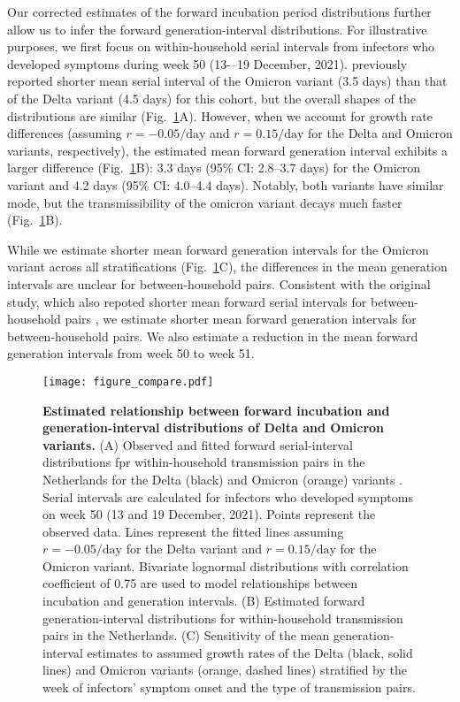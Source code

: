 \documentclass[12pt]{article}
\newcommand{\fref}[1]{Fig.~\ref{fig:#1}}
\begin{document}
Our corrected estimates of the forward incubation period distributions further allow us to infer the forward generation-interval distributions.
For illustrative purposes, we first focus on within-household serial intervals from infectors who developed symptoms during week 50 (13-–19 December, 2021).
\citep{backer2021omicron} previously reported shorter mean serial interval of the Omicron variant (3.5 days) than that of the Delta variant (4.5 days) for this cohort, but the overall shapes of the distributions are similar (\fref{serial}A).
However, when we account for growth rate differences (assuming $r=-0.05/\mathrm{day}$ and $r=0.15/\mathrm{day}$ for the Delta and Omicron variants, respectively), the estimated mean forward generation interval exhibits a larger difference (\fref{serial}B): 3.3 days (95\% CI: 2.8--3.7 days) for the Omicron variant and 4.2 days (95\% CI: 4.0--4.4 days).
Notably, both variants have similar mode, but the transmissibility of the omicron variant decays much faster (\fref{serial}B).

While we estimate shorter mean forward generation intervals for the Omicron variant across all stratifications (\fref{serial}C), the differences in the mean generation intervals are unclear for between-household pairs.
Consistent with the original study, which also repoted shorter mean forward serial intervals for between-household pairs \citep{backer2021omicron}, we estimate shorter mean forward generation intervals for between-household pairs.
We also estimate a reduction in the mean forward generation intervals from week 50 to week 51. 

\begin{figure}[!th]
\texttt{[image: figure\_compare.pdf]}
\caption{
\textbf{Estimated relationship between forward incubation and generation-interval distributions of Delta and Omicron variants.}
(A) Observed and fitted forward serial-interval distributions fpr within-household transmission pairs in the Netherlands for the Delta (black) and Omicron (orange) variants \citep{backer2021omicron}.
Serial intervals are calculated for infectors who developed symptoms on week 50 (13 and 19 December, 2021).
Points represent the observed data.
Lines represent the fitted lines assuming $r=-0.05/\textrm{day}$ for the Delta variant and $r=0.15/\textrm{day}$ for the Omicron variant. 
Bivariate lognormal distributions with correlation coefficient of 0.75 are used to model relationships between incubation and generation intervals.
(B) Estimated forward generation-interval distributions for within-household transmission pairs in the Netherlands.
(C) Sensitivity of the mean generation-interval estimates to assumed growth rates of the Delta (black, solid lines) and Omicron variants (orange, dashed lines) stratified by the week of infectors' symptom onset and the type of transmission pairs.
\label{fig:serial}
}
\end{figure}
\end{document}
